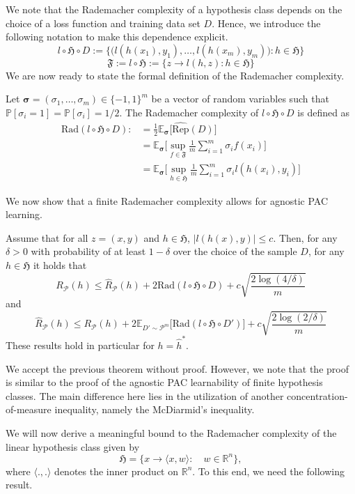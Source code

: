 We note that the Rademacher complexity of a hypothesis class depends on the
choice of a loss function and training data set $D$. Hence, we introduce the
following notation to make this dependence explicit.
$$l \circ \mathfrak{H} \circ D := \{\bigl(l(h(x_1), y_1), \dots, l(h(x_m), y_m)\bigr) : h \in
\mathfrak{H}\}$$
$$
\mathfrak{F} := l \circ \mathfrak{H} := \{ z \to l(h,z): h \in \mathfrak{H}\}
$$
We are now ready to state the formal definition of the Rademacher complexity.
\begin{definition}
Let $\mathbf{\sigma} = (\sigma_1, \dots, \sigma_m) \in \{-1,1\}^m$ be a vector
of random variables such that $\mathbb{P} [\sigma_i = 1] = \mathbb{P} [\sigma_i]
= 1/2$. The Rademacher complexity of $l\circ \mathfrak{H} \circ D$ is defined as
\begin{align*}
\text{Rad}(l \circ \mathfrak{H} \circ D) :&= \frac{1}{2} \mathbb{E}_{\mathbf{\sigma}} \bigl[ \hat{\text{Rep}}(D) \bigr] \\
&=\mathbb{E}_{\mathbf{\sigma}} \bigl[ \sup_{f \in \mathfrak{F}} \frac{1}{m} \sum_{i=1}^{m} \sigma_i f(x_i) \bigr] \\
&= \mathbb{E}_{\mathbf{\sigma}} \bigl[ \sup_{h \in \mathfrak{H}} \frac{1}{m} \sum_{i=1}^{m} \sigma_i l(h(x_i), y_i) \bigr]
\end{align*} 
\end{definition}
We now show that a finite Rademacher complexity allows for agnostic PAC learning.
\begin{thm}
	Assume that for all $z=(x,y)$ and $h \in \mathfrak{H}$, $|l(h(x),y)| \leq c$.
	Then, for any $\delta > 0$ with probability of at least $1-\delta$ over
	the choice of the sample $D$, for any $h \in \mathfrak{H}$ it holds that
	$$
	R_{\mathcal{P}}(h) \leq \hat{R}_{\mathcal{P}}(h) + 2 \text{Rad}(l \circ \mathfrak{H} \circ D) + c \sqrt{\frac{2 \log(4/\delta)}{m}}
	$$
	and 
	$$
	\hat{R}_{\mathcal{P}}(h) \leq R_{\mathcal{P}}(h) + 2 \mathbb{E}_{D' \sim \mathcal{P}^m} \bigl[ \text{Rad}(l \circ \mathfrak{H} \circ D') \bigr] + c \sqrt{\frac{2 \log(2/\delta)}{m}}
	$$
	These results hold in particular for $h=\hat{h}^*$.
\end{thm}
We accept the previous theorem without proof. However, we note that the proof is
similar to the proof of the agnostic PAC learnability of finite hypothesis
classes. The main difference here lies in the utilization of another
concentration-of-measure inequality, namely the McDiarmid's inequality.

We will now derive a meaningful bound to the Rademacher complexity of the
linear hypothesis class given by 
$$
\mathfrak{H} = \{x \to \langle x, w \rangle: \quad w \in  \mathbb{R}^n\},
$$
where $\langle., . \rangle$ denotes the inner product on $\mathbb{R}^n$. To this
end, we need the following result.

